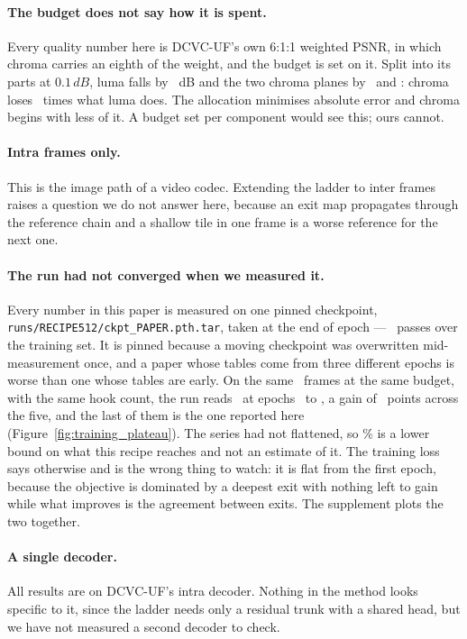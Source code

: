 \documentclass[10pt,twocolumn,letterpaper]{article}
\newcommand{\dB}{\,dB}
\begin{document}
\paragraph{The budget does not say how it is spent.} Every quality number here
is DCVC-UF's own 6:1:1 weighted PSNR, in which chroma carries an eighth of the
weight, and the budget is set on it. Split into its parts at $0.1\dB$, luma
falls by \ChromaLumaDrop\ dB and the two chroma planes by \ChromaUDrop\ and
\ChromaVDrop: chroma loses \ChromaRatio\ times what luma does. The allocation
minimises absolute error and chroma begins with less of it. A budget set per
component would see this; ours cannot.

\paragraph{Intra frames only.} This is the image path of a video codec.
Extending the ladder to inter frames raises a question we do not answer here,
because an exit map propagates through the reference chain and a shallow tile in
one frame is a worse reference for the next one.

\paragraph{The run had not converged when we measured it.} Every number in this
paper is measured on one pinned checkpoint, \texttt{runs/RECIPE512/ckpt\_PAPER.pth.tar},
taken at the end of epoch \PaperEpoch --- \PaperPasses\ passes over the training
set. It is pinned because a moving checkpoint was overwritten mid-measurement
once, and a paper whose tables come from three different epochs is worse than one
whose tables are early. On the same \NumSeq\ frames at the same budget, with the
same hook count, the run reads \EpochSeries\ at epochs \EpochFirst\ to
\EpochLatest, a gain of \EpochGain\ points across the five, and the last of them
is the one reported here (Figure~\ref{fig:training_plateau}). The series had not
flattened, so \MeanAtOne\% is a lower bound on what this recipe reaches and not
an estimate of it. The training loss says otherwise and is the wrong thing to
watch: it is flat from the first epoch, because the objective is dominated by a
deepest exit with nothing left to gain while what improves is the agreement
between exits. The supplement plots the two together.


\paragraph{A single decoder.} All results are on DCVC-UF's intra decoder. Nothing
in the method looks specific to it, since the ladder needs only a residual trunk
with a shared head, but we have not measured a second decoder to check.
\end{document}

